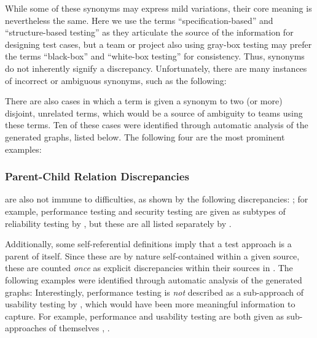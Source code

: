 While some of these synonyms may express mild variations, their core meaning
is nevertheless the same. Here we use the terms ``specification-based'' and
``structure-based testing'' as they articulate the source of the information
for designing test cases, but a team or project also using gray-box testing may
prefer the terms ``black-box'' and ``white-box testing'' for consistency.
Thus, synonyms do not inherently signify a discrepancy. Unfortunately, there
are many instances of incorrect or ambiguous synonyms, such as the following:



\label{multiSyns}
There are also cases in which a term is given a synonym to two (or more)
disjoint, unrelated terms, which would be a source of ambiguity to teams using
these terms. Ten of these cases were identified through automatic analysis of
the generated graphs\ifnotpaper, listed below\else. The following four are the
most prominent examples\fi:

\ifnotpaper\else\fi

\begin{enumerate}
    
\end{enumerate}

\subsubsection{Parent-Child Relation Discrepancies}
\label{pars}

 are also not immune to difficulties\ifnotpaper, as shown
by the following discrepancies:
 \else; for example, performance \fi testing and
security testing are given as subtypes of reliability testing by
\citep{ISO_IEC2023a}, but these are all listed separately by
\citep[p.~53]{Firesmith2015}.

\label{selfPars}
Additionally, some self-referential definitions imply that a test
approach is a parent of itself. Since these are by nature self-contained within
a given source, these are counted \emph{once} as explicit discrepancies within
their sources in . \ifnotpaper The following examples were
    identified through automatic analysis of the generated graphs:
     Interestingly, performance testing is \emph{not}
    described as a sub-approach of usability testing by \citep{Gerrard2000a,
        Gerrard2000b}, which would have been more meaningful information to
    capture. \else For example, performance and usability testing are both
    given as sub-approaches of themselves \cite[Tab.~2]{Gerrard2000a},
    \cite[Tab.~1]{Gerrard2000b}.\fi


